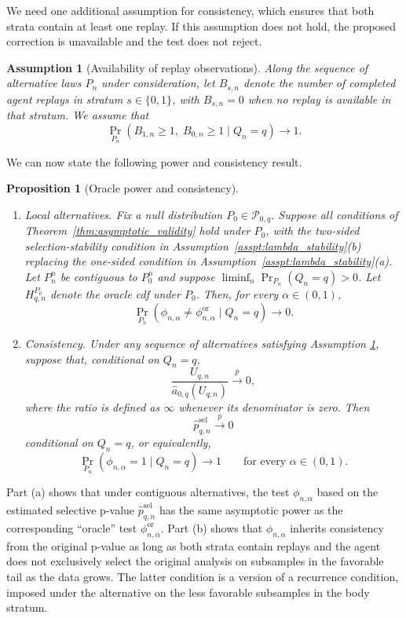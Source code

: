 \documentclass[10pt]{article}
\newtheorem{proposition}{Proposition}
\newtheorem{assumption}{Assumption}
\begin{document}
We need one additional assumption for consistency, which ensures that both strata contain at least one replay. If this assumption does not hold, the proposed correction is unavailable and the test does not reject.

\begin{assumption}[Availability of replay observations]
\label{asspt:replay_availability}
Along the sequence of alternative laws $P_n$ under consideration, let $B_{s,n}$ denote the number of completed agent replays in stratum $s\in\{0,1\}$, with $B_{s,n}=0$ when no replay is available in that stratum. We assume that
\[
\Pr_{P_n}\!\left(
B_{1,n}\geq 1,\; B_{0,n}\geq 1
\mid Q_n=q
\right)\longrightarrow 1.
\]
\end{assumption}

We can now state the following power and consistency result.

\begin{proposition}[Oracle power and consistency]\mbox{}
\label{prop:replay_power}
\begin{enumerate}[label=(\alph*)]
\item \textit{Local alternatives.}
Fix a null distribution $P_0\in\mathcal P_{0,q}$. Suppose all conditions of Theorem~\ref{thm:asymptotic_validity} hold under $P_0$, with the two-sided selection-stability condition in Assumption~\ref{asspt:lambda_stability}(b) replacing the one-sided condition in Assumption~\ref{asspt:lambda_stability}(a).
Let $P_n^n$ be contiguous to $P_0^n$ and suppose $\liminf_n\Pr_{P_n}(Q_n=q)>0$.
Let $H_{q,n}^{P_0}$ denote the oracle cdf under $P_0$. Then, for every $\alpha\in(0,1)$,
\[
\Pr_{P_n}\!\left(\phi_{n,\alpha}\neq\phi^{\mathrm{or}}_{n,\alpha}\mid Q_n=q\right)\longrightarrow0.
\]

\item \textit{Consistency.}
Under any sequence of alternatives satisfying Assumption \ref{asspt:replay_availability}, suppose that,
conditional on $Q_n=q$,
\[
\frac{U_{q,n}}
{\widehat a_{0,q}(U_{q,n})}
\stackrel{p}{\longrightarrow}0,
\]
where the ratio is defined as $\infty$ whenever
its denominator is zero. Then
\[
\widehat p_{q,n}^{\mathrm{sel}}
\stackrel{p}{\longrightarrow}0
\]
conditional on $Q_n=q$, or equivalently,
\[
\Pr_{P_n}\!\left(\phi_{n,\alpha}=1\mid Q_n=q\right)\longrightarrow1
\qquad\text{for every }\alpha\in(0,1).
\]
\end{enumerate}
\end{proposition}

Part (a) shows that under contiguous alternatives, the test $\phi_{n,\alpha}$ based on the estimated selective p-value $\widehat p_{q,n}^{\mathrm{sel}}$ has the same asymptotic power as the corresponding ``oracle'' test $\phi^{\mathrm{or}}_{n,\alpha}$. Part (b) shows that $\phi_{n,\alpha}$ inherits consistency from the original p-value as long as both strata contain replays and the agent does not exclusively select the original analysis on subsamples in the favorable tail as the data grows. The latter condition is a version of a recurrence condition, imposed under the alternative on the less favorable subsamples in the body stratum.
\end{document}
